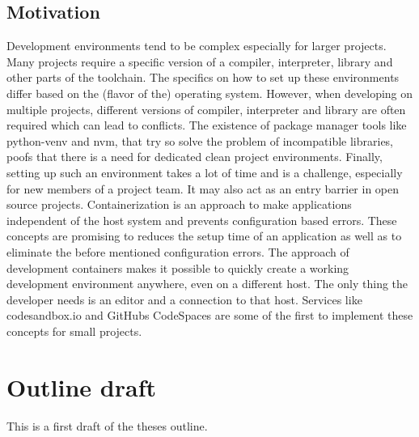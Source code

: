 \documentclass[12pt, a4paper]{article}
\begin{document}
\subsection{Motivation}
Development environments tend to be complex especially for larger projects. Many projects require a specific version of a compiler, interpreter, library and other parts of the toolchain. The specifics on how to set up these environments differ based on the (flavor of the) operating system. However, when developing on multiple projects, different versions of compiler, interpreter and library are often required which can lead to conflicts. The existence of package manager tools like \ac{python-venv} and \ac{nvm}, that try so solve the problem of incompatible libraries, poofs that there is a need for dedicated clean project environments.\newline
Finally, setting up such an environment takes a lot of time and is a challenge, especially for new members of a project team. It may also act as an entry barrier in open source projects.\newline
Containerization is an approach to make applications independent of the host system and prevents configuration based errors. These concepts are promising to reduces the setup time of an application as well as to eliminate the before mentioned configuration errors. The approach of development containers makes it possible to quickly create a working development environment anywhere, even on a different host. The only thing the developer needs is an editor and a connection to that host. Services like codesandbox.io and GitHubs CodeSpaces are some of the first to implement these concepts for small projects.
\newpage
\section{Outline draft}
This is a first draft of the theses outline.
\end{document}
